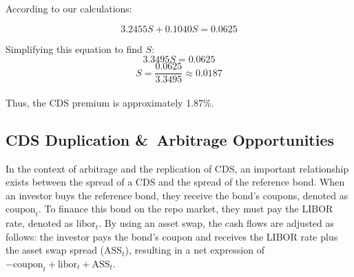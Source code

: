 \documentclass[a4paper,10pt]{article}
\begin{document}
\begin{table}[h!]
\centering
{}
\caption{ Present Value of the Compensation in case of Default.\\}
\end{table}

\noindent According to our calculations:

\[3.2455 S + 0.1040 S = 0.0625\]

\noindent Simplifying this equation to find \( S \):
\[3.3495 S = 0.0625\]
\[S = \frac{0.0625}{3.3495}\approx 0.0187\]\\

\noindent Thus, the CDS premium is approximately 1.87\%.\\

\subsection{CDS Duplication \&\ Arbitrage Opportunities}
\noindent In the context of arbitrage and the replication of CDS, an important relationship exists between the spread of a CDS and the spread of the reference bond. When an investor buys the reference bond, they receive the bond's coupons, denoted as \( \text{coupon}_t \). To finance this bond on the repo market, they must pay the LIBOR rate, denoted as \( \text{libor}_t \). By using an asset swap, the cash flows are adjusted as follows: the investor pays the bond's coupon and receives the LIBOR rate plus the asset swap spread (\( \text{ASS}_t \)), resulting in a net expression of \(- \text{coupon}_t + \text{libor}_t + \text{ASS}_t\).\\
\end{document}
